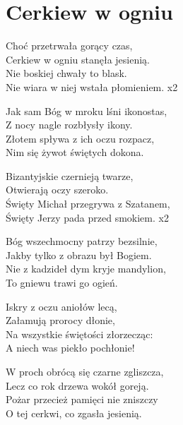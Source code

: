 \section{Cerkiew w ogniu}
\noindent %
\begin{text}
    Choć przetrwała gorący czas,\\
    Cerkiew w ogniu stanęła jesienią.\\
    Nie boskiej chwały to blask.\\
    Nie wiara w niej wstała płomieniem. x2

    Jak sam Bóg w mroku lśni ikonostas,\\
    Z nocy nagle rozbłysły ikony.\\
    Złotem spływa z ich oczu rozpacz,\\
    Nim się żywot świętych dokona.

    Bizantyjskie czernieją twarze,\\
    Otwierają oczy szeroko.\\
    \vin Święty Michał przegrywa z Szatanem,\\
    \vin Święty Jerzy pada przed smokiem. x2

    Bóg wszechmocny patrzy bezsilnie,\\
    Jakby tylko z obrazu był Bogiem.\\
    Nie z kadzideł dym kryje mandylion,\\
    To gniewu trawi go ogień.

    Iskry z oczu aniołów lecą,\\
    Załamują prorocy dłonie,\\
    Na wszystkie świętości złorzecząc:\\
    A niech was piekło pochłonie!

    W proch obrócą się czarne zgliszcza,\\
    Lecz co rok drzewa wokół goreją.\\
    Pożar przecież pamięci nie zniszczy\\
    O tej cerkwi, co zgasła jesienią.
\end{text}
\begin{chord}
\end{chord}